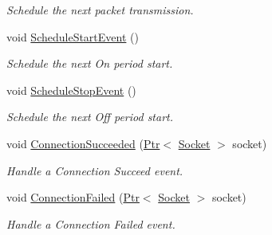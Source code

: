 \begin{DoxyCompactItemize}
\begin{DoxyCompactList}\small\item\em Schedule the next packet transmission. \end{DoxyCompactList}\item 
void \hyperlink{classns3_1_1OnOffApplication_a20124d7b90ced13c6b92388b6ab0d8f9}{Schedule\+Start\+Event} ()
\begin{DoxyCompactList}\small\item\em Schedule the next On period start. \end{DoxyCompactList}\item 
void \hyperlink{classns3_1_1OnOffApplication_a77a666c5f73ec9a94fb06ca47c5b6dde}{Schedule\+Stop\+Event} ()
\begin{DoxyCompactList}\small\item\em Schedule the next Off period start. \end{DoxyCompactList}\item 
void \hyperlink{classns3_1_1OnOffApplication_a115f35207179049544c5665a352c766f}{Connection\+Succeeded} (\hyperlink{classns3_1_1Ptr}{Ptr}$<$ \hyperlink{classns3_1_1Socket}{Socket} $>$ socket)
\begin{DoxyCompactList}\small\item\em Handle a Connection Succeed event. \end{DoxyCompactList}\item 
void \hyperlink{classns3_1_1OnOffApplication_a73c43bc3598ca07e1705194edcba73ce}{Connection\+Failed} (\hyperlink{classns3_1_1Ptr}{Ptr}$<$ \hyperlink{classns3_1_1Socket}{Socket} $>$ socket)
\begin{DoxyCompactList}\small\item\em Handle a Connection Failed event. \end{DoxyCompactList}\end{DoxyCompactItemize}
